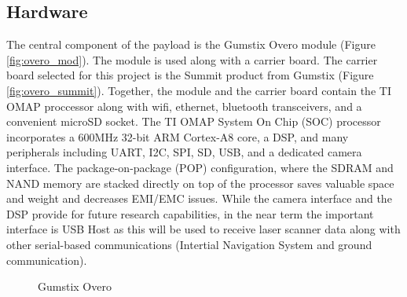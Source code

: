 \documentclass[a4paper,11pt]{report}
\begin{document}
\subsection{Hardware}

The central component of the payload is the Gumstix Overo module (Figure \ref{fig:overo_mod}). The module is used along with a carrier board. The carrier board selected for this project is the Summit product from Gumstix (Figure \ref{fig:overo_summit}). Together, the module and the carrier board contain the TI OMAP proccessor along with wifi, ethernet, bluetooth transceivers, and a convenient microSD socket. The TI OMAP System On Chip (SOC) processor incorporates a 600MHz 32-bit ARM Cortex-A8 core, a DSP, and many peripherals including UART, I2C, SPI, SD, USB, and a dedicated camera interface. The package-on-package (POP) configuration, where the SDRAM and NAND memory are stacked directly on top of the processor saves valuable space and weight and decreases EMI/EMC issues. While the camera interface and the DSP provide for future research capabilities, in the near term the important interface is USB Host as this will be used to receive laser scanner data along with other serial-based communications (Intertial Navigation System and ground communication).

\begin{figure}[htb]
  \centering
  \caption{Gumstix Overo}
  \label{fig:overo}
\end{figure}
\end{document}
